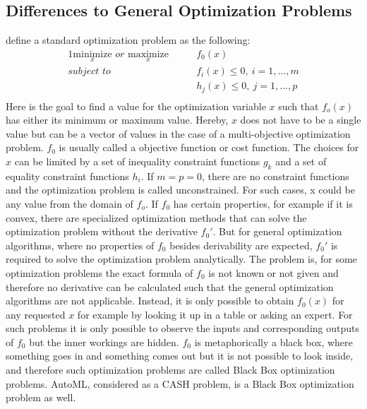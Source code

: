 \subsection{Differences to General Optimization Problems}
\label{sec:theory:optimization:differences}
\textcite{Boyd-Optimization} define a standard optimization problem as the following:
\begin{alignat*}{1}
    \underset{x}{\mathrm{minimize}} \textit{ or } \underset{x}{\mathrm{maximize}} \qquad & f_0(x)\\
    \textit{subject to} \qquad & f_i(x) \leq 0,\> i=1,...,m\\
                        &  h_j(x) \leq 0,\> j=1,...,p\\
\end{alignat*}
Here is the goal to find a value for the optimization variable $x$ such that $f_o(x)$ has either its minimum or maximum value.
Hereby, $x$ does not have to be a single value but can be a vector of values in the case of a multi-objective optimization problem.
$f_0$ is usually called a objective function or cost function.
The choices for $x$ can be limited by a set of inequality constraint functions $g_k$ and a set of equality constraint functions $h_i$.
If $m=p=0$, there are no constraint functions and the optimization problem is called unconstrained.
For such cases, x could be any value from the domain of $f_o$.\newline
If $f_0$ has certain properties, for example if it is convex, there are specialized optimization methods that can solve the optimization problem without the derivative $f_0'$.
But for general optimization algorithms, where no properties of $f_0$ besides derivability are expected, $f_0'$ is required to solve the optimization problem analytically.\newline
The problem is, for some optimization problems the exact formula of $f_0$ is not known or not given and therefore no derivative can be calculated such that the general optimization algorithms are not applicable.
Instead, it is only possible to obtain $f_0(x)$ for any requested $x$ for example by looking it up in a table or asking an expert.
For such problems it is only possible to observe the inputs and corresponding outputs of $f_0$ but the inner workings are hidden.
$f_0$ is metaphorically a black box, where something goes in and something comes out but it is not possible to look inside, and therefore such optimization problems are called Black Box optimization problems.\newline
AutoML, considered as a CASH problem, is a Black Box optimization problem as well.
